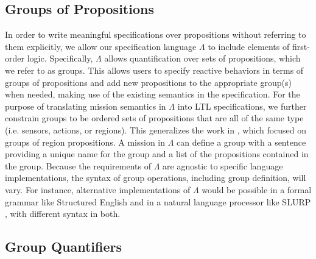 \subsection{Groups of Propositions} 

In order to write meaningful specifications over propositions without referring to them explicitly, we allow our specification language $\Lambda$ to include elements of first-order logic. 
Specifically, $\Lambda$ allows quantification over sets of propositions, which we refer to as groups. 
This allows users to specify reactive behaviors in terms of groups of propositions and add new propositions to the appropriate group(s) when needed, making use of the existing semantics in the specification. 
For the purpose of translating mission semantics in $\Lambda$ into LTL specifications, we further constrain groups to be ordered sets of propositions that are all of the same type (i.e. sensors, actions, or regions). 
This generalizes the work in \cite{BingxinRSS2012}, which focused on groups of region propositions. 
A mission in $\Lambda$ can define a group with a sentence providing a unique name for the group and a list of the propositions contained in the group. 
Because the requirements of $\Lambda$ are agnostic to specific language implementations, the syntax of group operations, including group definition, will vary. 
For instance, alternative implementations of $\Lambda$ would be possible in a formal grammar like Structured English and in a natural language processor like SLURP \cite{RamanRSS2013}, with different syntax in both. 

\subsection{Group Quantifiers} 

